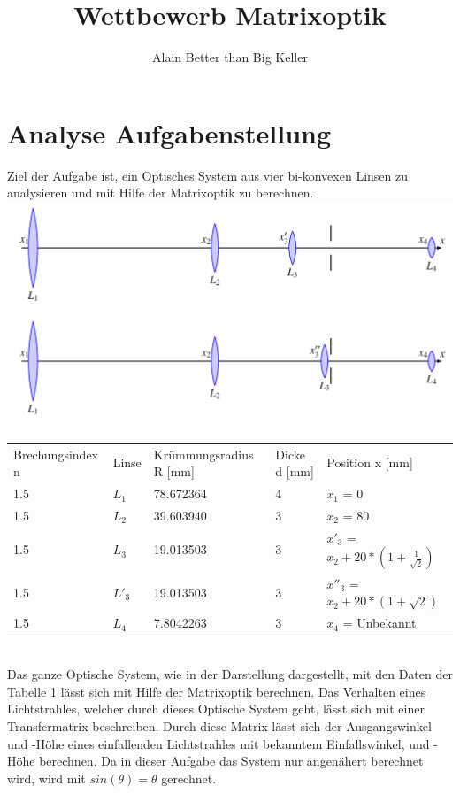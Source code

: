 \documentclass[11pt,twoside,a4paper]{article}
\title{Wettbewerb Matrixoptik}
\author{Alain Better than Big Keller}
\begin{document}
	\maketitle
	\section{Analyse Aufgabenstellung}
	Ziel der Aufgabe ist, ein Optisches System aus vier bi-konvexen Linsen zu analysieren und mit Hilfe der Matrixoptik zu berechnen. \\
	\includegraphics[scale=.25]{./system.PNG}
	\begin{table}
		\centering
		\begin{tabular}{lllll}
			Brechungsindex n & Linse & Krümmungsradius R [mm]& Dicke d [mm] & Position x [mm] \\
			1.5 & \(L_{1}\) & 78.672364 & 4 & \(x_{1}\) = 0 \\
			1.5 & \(L_{2}\) & 39.603940 & 3 & \(x_{2}\) = 80 \\
			1.5 & \(L_{3}\) & 19.013503 & 3 & \(x'_{3}\) = \(x_{2} + 20 * (1+\frac{1}{\sqrt{2}})\)  \\
			1.5 & \(L'_{3}\) & 19.013503 & 3 & \(x''_{3}\) = \(x_{2} + 20 * (1+\sqrt{2})\) \\
			1.5 & \(L_{4}\) & 7.8042263 & 3 & \(x_{4}\) = Unbekannt \\
		\end{tabular}
	\end{table} \\
	Das ganze Optische System, wie in der Darstellung dargestellt, mit den Daten der Tabelle 1 lässt sich mit Hilfe der Matrixoptik berechnen. Das Verhalten eines Lichtstrahles, welcher durch dieses Optische System geht, lässt sich mit einer Transfermatrix beschreiben. Durch diese Matrix lässt sich der Ausgangswinkel und -Höhe eines einfallenden Lichtstrahles mit bekanntem Einfallswinkel, und -Höhe berechnen. Da in dieser Aufgabe das System nur angenähert berechnet wird, wird mit \(sin(\theta) = \theta\) gerechnet.
\end{document}
